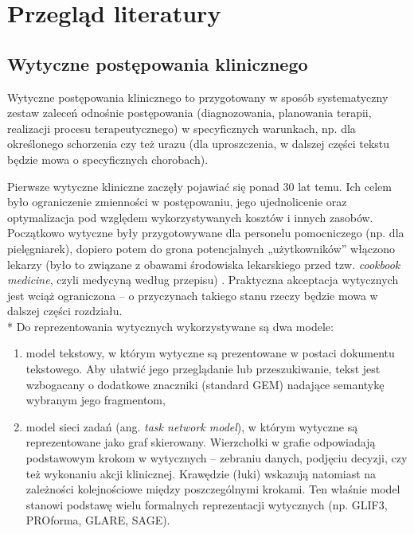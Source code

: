 \chapter{Przegląd literatury}
\section{Wytyczne postępowania klinicznego}
Wytyczne postępowania klinicznego to przygotowany w sposób systematyczny zestaw zaleceń odnośnie postępowania (diagnozowania, planowania terapii, realizacji procesu terapeutycznego) w specyficznych warunkach, np. dla określonego schorzenia czy też urazu \cite{Latoszek-Berendsen} (dla uproszczenia, w dalszej części tekstu będzie mowa o specyficznych chorobach).

Pierwsze wytyczne kliniczne zaczęły pojawiać się ponad 30 lat temu. Ich celem było ograniczenie zmienności w postępowaniu, jego ujednolicenie oraz optymalizacja pod względem wykorzystywanych kosztów i innych zasobów. Początkowo wytyczne były przygotowywane dla personelu pomocniczego (np. dla pielęgniarek), dopiero potem do grona potencjalnych „użytkowników” włączono lekarzy (było to związane z obawami środowiska lekarskiego przed tzw. \textit{cookbook medicine}, czyli medycyną według przepisu) \cite{Latoszek-Berendsen}. Praktyczna akceptacja wytycznych jest wciąż ograniczona -- o przyczynach takiego stanu rzeczy będzie mowa w dalszej części rozdziału.\\*
Do reprezentowania wytycznych wykorzystywane są dwa modele:
\begin{enumerate}
\item model tekstowy, w którym wytyczne są prezentowane w postaci dokumentu tekstowego. Aby ułatwić jego przeglądanie lub przeszukiwanie, tekst jest wzbogacany o dodatkowe znaczniki (standard GEM) nadające semantykę wybranym jego fragmentom,
\item model sieci zadań (ang. \textit{task network model}), w którym wytyczne są reprezentowane jako graf skierowany. Wierzchołki w grafie odpowiadają podstawowym krokom w wytycznych -- zebraniu danych, podjęciu decyzji, czy też wykonaniu akcji klinicznej. Krawędzie (łuki) wskazują natomiast na zależności kolejnościowe między poszczególnymi krokami. Ten właśnie model stanowi podstawę wielu formalnych reprezentacji wytycznych (np. GLIF3, PROforma, GLARE, SAGE).
\end{enumerate}

